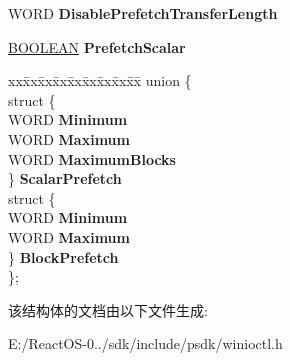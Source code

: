 \begin{DoxyCompactItemize}
\item 
\mbox{\label{struct___d_i_s_k___c_a_c_h_e___i_n_f_o_r_m_a_t_i_o_n_a8426264a3d21e719b9c04ca8e196916c}} 
W\+O\+RD {\bfseries Disable\+Prefetch\+Transfer\+Length}
\item 
\mbox{\label{struct___d_i_s_k___c_a_c_h_e___i_n_f_o_r_m_a_t_i_o_n_ac2b2237e0ec7ca86228b3ab265bf6271}} 
\hyperlink{_processor_bind_8h_a112e3146cb38b6ee95e64d85842e380a}{B\+O\+O\+L\+E\+AN} {\bfseries Prefetch\+Scalar}
\item 
\mbox{\label{struct___d_i_s_k___c_a_c_h_e___i_n_f_o_r_m_a_t_i_o_n_a1f10a26fabd862f6d6e174895431f8f9}} 
\begin{tabbing}
xx\=xx\=xx\=xx\=xx\=xx\=xx\=xx\=xx\=\kill
union \{\\
\>struct \{\\
\>\>WORD {\bfseries Minimum}\\
\>\>WORD {\bfseries Maximum}\\
\>\>WORD {\bfseries MaximumBlocks}\\
\>\} {\bfseries ScalarPrefetch}\\
\>struct \{\\
\>\>WORD {\bfseries Minimum}\\
\>\>WORD {\bfseries Maximum}\\
\>\} {\bfseries BlockPrefetch}\\
\}; \\

\end{tabbing}\end{DoxyCompactItemize}


该结构体的文档由以下文件生成\+:\begin{DoxyCompactItemize}
\item 
E\+:/\+React\+O\+S-\/0../sdk/include/psdk/winioctl.\+h\end{DoxyCompactItemize}
